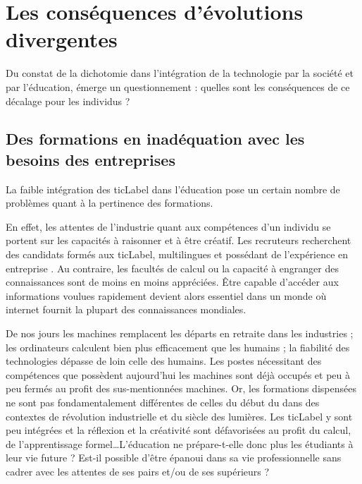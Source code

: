 
\chapter{Les conséquences d'évolutions divergentes}
Du constat de la dichotomie dans l'intégration de la technologie par la société et par l'éducation, émerge un questionnement : quelles sont les conséquences de ce décalage pour les individus ?



\section{Des formations en inadéquation avec les besoins des entreprises}
La faible intégration des \gls{ticLabel} dans l'éducation pose un certain nombre de problèmes quant à la pertinence des formations.

En effet, les attentes de l'industrie quant aux compétences d'un individu se portent sur les capacités à raisonner et à être créatif. Les recruteurs recherchent des candidats formés aux \gls{ticLabel}, multilingues et possédant de l'expérience en entreprise \cite{DRH_criteres}. Au contraire, les facultés de calcul ou la capacité à engranger des connaissances sont de moins en moins appréciées. Être capable d'accéder aux informations voulues rapidement devient alors essentiel dans un monde où internet fournit la plupart des connaissances mondiales.

De nos jours les machines remplacent les départs en retraite dans les industries ; les ordinateurs calculent bien plus efficacement que les humains ; la fiabilité des technologies dépasse de loin celle des humains. Les postes nécessitant des compétences que possèdent aujourd'hui les machines sont déjà occupés et peu à peu fermés au profit des sus-mentionnées machines. Or, les formations dispensées ne sont pas fondamentalement différentes de celles du début du   \cite{robinson2010paradigms} dans des contextes de révolution industrielle et du siècle des lumières. Les \gls{ticLabel} y sont peu intégrées et la réflexion et la créativité sont défavorisées au profit du calcul, de l'apprentissage formel\ldots L'éducation ne prépare-t-elle donc plus les étudiants à leur vie future \cite{formation_recrutement} ? Est-il possible d'être épanoui dans sa vie professionnelle sans cadrer avec les attentes de ses pairs et/ou de ses supérieurs ?

